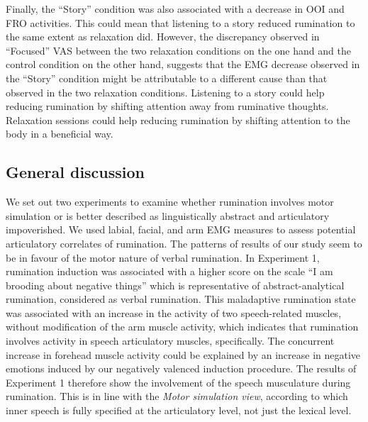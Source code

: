 \documentclass[a4paper,12pt,twoside,onecolumn,openright,final,oldfontcommands]{memoir}
\begin{document}
Finally, the \enquote{Story} condition was also associated with a decrease in OOI and FRO activities. This could mean that listening to a story reduced rumination to the same extent as relaxation did. However, the discrepancy observed in \enquote{Focused} VAS between the two relaxation conditions on the one hand and the control condition on the other hand, suggests that the EMG decrease observed in the \enquote{Story} condition might be attributable to a different cause than that observed in the two relaxation conditions. Listening to a story could help reducing rumination by shifting attention away from ruminative thoughts. Relaxation sessions could help reducing rumination by shifting attention to the body in a beneficial way.

\hypertarget{general-discussion}{%
\subsection{General discussion}\label{general-discussion}}

We set out two experiments to examine whether rumination involves motor simulation or is better described as linguistically abstract and articulatory impoverished. We used labial, facial, and arm EMG measures to assess potential articulatory correlates of rumination. The patterns of results of our study seem to be in favour of the motor nature of verbal rumination. In Experiment 1, rumination induction was associated with a higher score on the scale \enquote{I am brooding about negative things} which is representative of abstract-analytical rumination, considered as verbal rumination. This maladaptive rumination state was associated with an increase in the activity of two speech-related muscles, without modification of the arm muscle activity, which indicates that rumination involves activity in speech articulatory muscles, specifically. The concurrent increase in forehead muscle activity could be explained by an increase in negative emotions induced by our negatively valenced induction procedure. The results of Experiment 1 therefore show the involvement of the speech musculature during rumination. This is in line with the \emph{Motor simulation view}, according to which inner speech is fully specified at the articulatory level, not just the lexical level.
\end{document}

